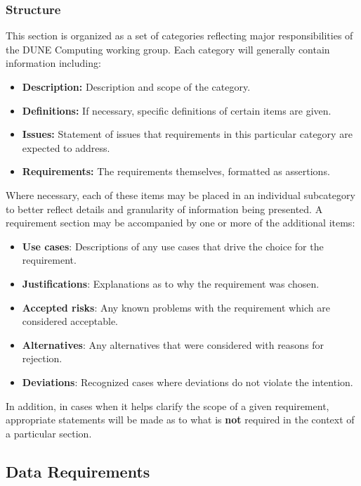 \subsubsection{Structure}

This section is organized as a set of categories reflecting major responsibilities of the DUNE Computing working group.  Each category will generally contain information including:

\begin{itemize}
\item \textbf{Description:} Description and scope of the category.
\item \textbf{Definitions:} If necessary, specific definitions of certain items are given.
\item \textbf{Issues:} Statement of issues that requirements in this particular category are expected to address.
\item \textbf{Requirements:} The requirements themselves, formatted as assertions.
\end{itemize}

Where necessary, each of these items may be placed in an individual subcategory to better reflect details and granularity of information being presented. A requirement section may be accompanied by one or more of the additional items:

\begin{itemize}
\item \textbf{Use cases}: Descriptions of any use cases that drive the choice for the requirement.
\item \textbf{Justifications}: Explanations as to why the requirement was chosen.
\item \textbf{Accepted risks}: Any known problems with the requirement which are considered acceptable.
\item \textbf{Alternatives}: Any alternatives that were considered with reasons for rejection.
\item \textbf{Deviations}: Recognized cases where deviations do not violate the intention.
\end{itemize}

In addition, in cases when it helps clarify the scope of a given  requirement, appropriate statements will be made as to what is \textbf{not} required in the context of a particular section.

\subsection{Data Requirements}
\label{sec:dunedata}


